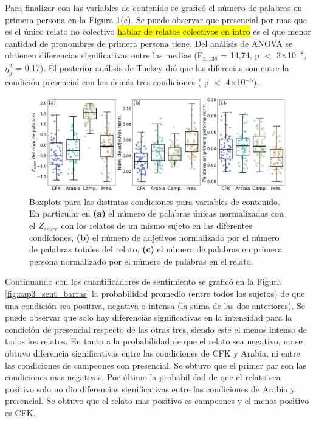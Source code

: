 Para finalizar con las variables de contenido se graficó el número de palabras en primera persona en la Figura \ref{fig:cap3_vars_contenido}(c). Se puede observar que presencial por mas que es el único relato no colectivo \colorbox{yellow}{hablar de relatos colectivos en intro} es el que menor cantidad de pronombres de primera persona tiene. Del análisis de ANOVA se obtienen diferencias significativas entre las medias (F$_{3, 138}$ = 14,74, p $<$ 3$\times$10$^{-8}$, $\eta_g^2$ = 0,17). El posterior análisis de Tuckey dió que las diferecias son entre la condición presencial con las demás tres condiciones ( p $<$ 4$\times$10$^{-5}$).

\begin{figure}[H]
    \centering
    \includegraphics[width = 15cm]{figures/ch03/Herramientas NPL/Primer tiempo/Sin control/contenido_op2_boxplot.pdf} 
    \caption{Boxplots para las distintas condiciones para variables de contenido. En particular en \textbf{(a)} el número de palabras únicas normalizadas con el $Z_{score}$ con los relatos de un mismo sujeto en las diferentes condiciones,  \textbf{(b)} el número de adjetivos normalizado por el número de palabras totales del relato, \textbf{(c)} el número de palabras en primera persona normalizado por el número de palabras en el relato.}
\label{fig:cap3_vars_contenido}
\end{figure}

Continuando con los cuantificadores de sentimiento se graficó en la Figura \ref{fig:cap3_sent_barras} la probabilidad promedio (entre todos los sujetos) de que una condición sea positiva, negativa o intensa (la suma de las dos anteriores). Se puede observar que solo hay diferencias significativas en la intensidad para la condición de presencial respecto de las otras tres, siendo este el menos intenso de todos los relatos. En tanto a la probabilidad de que el relato sea negativo, no se obtuvo diferencia significativas entre las condiciones de CFK y Arabia, ni entre las condiciones de campeones con presencial. Se obtuvo que el primer par son las condiciones mas negativas. Por último la probabilidad de que el relato sea positivo solo no dio diferencias significativas entre las condiciones de Arabia y presencial. Se obtuvo que el relato mas positivo es campeones y el menos positivo es CFK.

